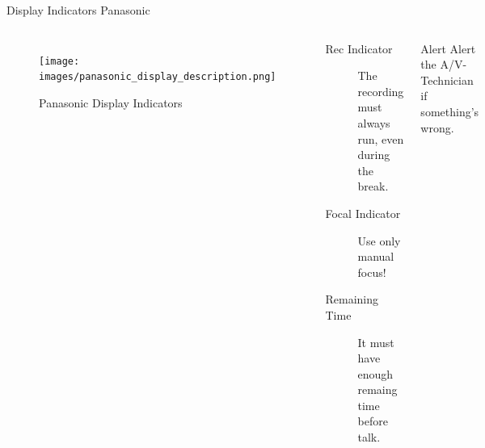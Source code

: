 \documentclass[aspectratio=169]{beamer}
\begin{document}


\begin{frame}{Display Indicators Panasonic}
	\begin{columns}[T,onlytextwidth]
	\begin{figure} 
		\centering
		\texttt{[image: images/panasonic\_display\_description.png]}
		\caption{Panasonic Display Indicators}
	\end{figure}
		\begin{description}
			\item[Rec Indicator] The recording must always run, even during the break.
			\item[Focal Indicator] Use only manual focus!
			\item[Remaining Time] It must have enough remaing time before talk.
		\end{description}
		\begin{alertblock}{Alert}
			Alert the A/V-Technician if something's wrong.
		\end{alertblock}
	\end{columns}
\end{frame}

\end{document}
